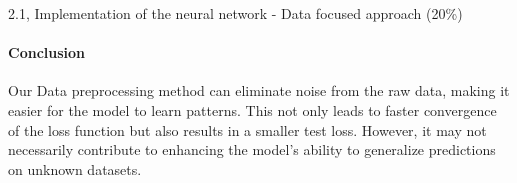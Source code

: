 \begin{task}{2.1, Implementation of the neural network - Data focused approach (20\%)}
\paragraph{Conclusion}
Our Data preprocessing method can eliminate noise from the raw data, making it easier for the model to learn patterns. This not only leads to faster convergence of the loss function but also results in a smaller test loss. However, it may not necessarily contribute to enhancing the model's ability to generalize predictions on unknown datasets.

\end{task}